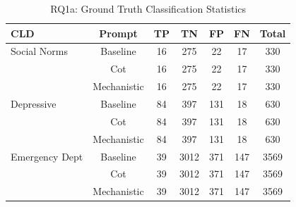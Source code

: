 \begin{table}[htbp]
\centreing
\caption{RQ1a: Ground Truth Classification Statistics}
\label{tab:rq1a_gt_classification}
\begin{tabular}{lcccccc}
\toprule
\textbf{CLD} & \textbf{Prompt} & \textbf{TP} & \textbf{TN} & \textbf{FP} & \textbf{FN} & \textbf{Total} \\
\midrule
Social Norms & Baseline & 16 & 275 & 22 & 17 & 330 \\
 & Cot & 16 & 275 & 22 & 17 & 330 \\
 & Mechanistic & 16 & 275 & 22 & 17 & 330 \\
\midrule
Depressive & Baseline & 84 & 397 & 131 & 18 & 630 \\
 & Cot & 84 & 397 & 131 & 18 & 630 \\
 & Mechanistic & 84 & 397 & 131 & 18 & 630 \\
\midrule
Emergency Dept & Baseline & 39 & 3012 & 371 & 147 & 3569 \\
 & Cot & 39 & 3012 & 371 & 147 & 3569 \\
 & Mechanistic & 39 & 3012 & 371 & 147 & 3569 \\
\midrule
\bottomrule
\end{tabular}
\end{table}